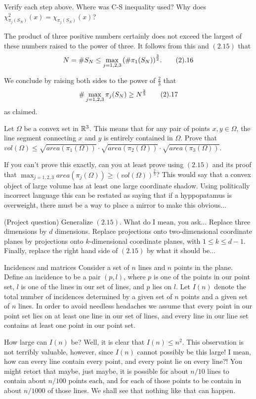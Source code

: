  Verify each step above. Where was C-S inequality
used? Why does $\chi^2_{\pi_j(S_N)}(x)=\chi_{\pi_j(S_N)}(x)$? \endproclaim

The product of three positive numbers certainly does not exceed the
largest of these numbers raised to the power of three. It follows from
this and $(2.15)$ that
$$ N=\# S_N \leq \max_{j=1,2,3} {(\# \pi_1(S_N))}^{\frac{3}{2}}.
\tag2.16$$

We conclude by raising both sides to the power of $\frac{2}{3}$ that
$$ \# \max_{j=1,2,3} \pi_j(S_N) \ge N^{\frac{2}{3}} \tag2.17$$ as
claimed.

 Let $\Omega$ be a convex set in ${\Bbb R}^3$.
This means that for any pair of points $x,y \in \Omega$, the line segment
connecting $x$ and $y$ is entirely contained in $\Omega$. Prove that
$vol(\Omega) \leq \sqrt{area(\pi_1(\Omega))} \cdot
\sqrt{area(\pi_2(\Omega))} \cdot \sqrt{area(\pi_3(\Omega))}$.

If you can't prove this exactly, can you at least prove using $(2.15)$
and its proof that $\max_{j=1,2,3} area(\pi_j(\Omega)) \ge
{(vol(\Omega))}^{\frac{2}{3}}$? This would say that a convex object of
large volume has at least one large coordinate shadow. Using politically
incorrect language this can be restated as saying that if a hyppopatamus
is overweight, there must be a way to place a mirror to make this
obvious... \endproclaim

 (Project question) Generalize $(2.15)$. What do I
mean, you ask... Replace three dimensions by $d$ dimensions. Replace
projections onto two-dimensional coordinate planes by projections onto
$k$-dimensional coordinate planes, with $1 \leq k \leq d-1$. Finally,
replace the right hand side of $(2.15)$ by what it should be...
\endproclaim

\subhead Incidences and matrices \endsubhead Consider a set of $n$ lines
and $n$ points in the plane. Define an incidence to be a pair $(p,l)$,
where $p$ is one of the points in our point set, $l$ is one of the lines
in our set of lines, and $p$ lies on $l$. Let $I(n)$ denote the total
number of incidences determined by a given set of $n$ points and a given
set of $n$ lines. In order to avoid needless headaches we assume that
every point in our point set lies on at least one line in our set of
lines, and every line in our line set contains at least one point in our
point set.

How large can $I(n)$ be? Well, it is clear that $I(n) \leq n^2$. This
observation is not terribly valuable, however, since $I(n)$ cannot
possibly be this large! I mean, how can every line contain every point,
and every point lie on every line?! You might retort that maybe, just
maybe, it is possible for about $n/10$ lines to contain about $n/100$
points each, and for each of those points to be contain in about $n/1000$
of those lines. We shall see that nothing like that can happen.

